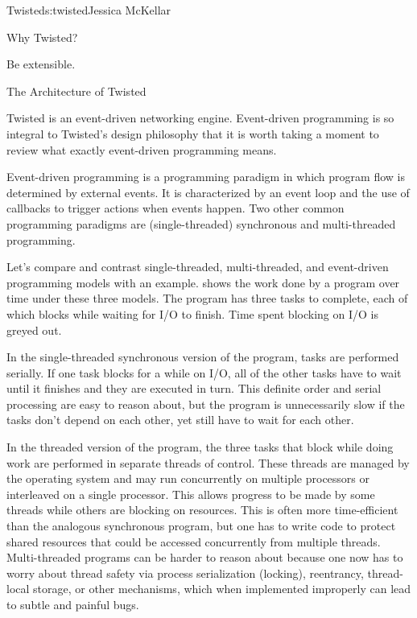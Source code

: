 \begin{aosachapter}{Twisted}{s:twisted}{Jessica McKellar}
\begin{aosasect1}{Why Twisted?}
\begin{aosaitemize}
\item Be extensible.

\end{aosaitemize}

\end{aosasect1}

\begin{aosasect1}{The Architecture of Twisted}

Twisted is an event-driven networking engine. Event-driven programming is so
integral to Twisted's design philosophy that it is worth taking a moment to
review what exactly event-driven programming means.

Event-driven programming is a programming paradigm in which program flow is
determined by external events. It is characterized by an event loop and the use
of callbacks to trigger actions when events happen. Two other common
programming paradigms are (single-threaded) synchronous and multi-threaded
programming.


Let's compare and contrast single-threaded, multi-threaded, and
event-driven programming models with an example.
 shows the work done by a
program over time under these three models. The program has three tasks to
complete, each of which blocks while waiting for I/O to finish. Time
spent blocking on I/O is greyed out.

In the single-threaded synchronous version of the program, tasks are
performed serially. If one task blocks for a while on I/O, all of the other
tasks have to wait until it finishes and they are executed in turn. This
definite order and serial processing are easy to reason about, but the program
is unnecessarily slow if the tasks don't depend on each other, yet still have to
wait for each other.

In the threaded version of the program, the three tasks that block while doing
work are performed in separate threads of control. These threads are managed by
the operating system and may run concurrently on multiple processors or
interleaved on a single processor. This allows progress to be made by some
threads while others are blocking on resources. This is often more
time-efficient than the analogous synchronous program, but one has to write code
to protect shared resources that could be accessed concurrently from multiple
threads. Multi-threaded programs can be harder to reason about because one now
has to worry about thread safety via process serialization (locking),
reentrancy, thread-local storage, or other mechanisms, which when implemented
improperly can lead to subtle and painful bugs.


\end{aosasect1}
\end{aosachapter}
